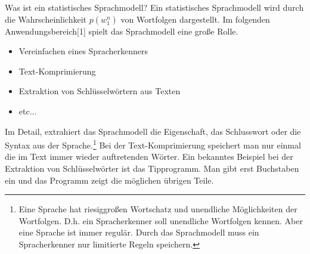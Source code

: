 
Was ist ein statistisches Sprachmodell? Ein statistisches Sprachmodell wird durch die Wahrscheinlichkeit $p(w_{1}^n)$ von Wortfolgen  dargestellt.
Im folgenden Anwendungsbereich[1] spielt das Sprachmodell eine gro\ss e Rolle.
\begin{itemize}
	\item Vereinfachen eines Spracherkenners
	\item Text-Komprimierung
	\item Extraktion von Schl\"usselw\"ortern aus Texten
	\item etc...
\end{itemize}
Im Detail, extrahiert das Sprachmodell die Eigenschaft, das Schlusswort oder die Syntax aus der Sprache.\footnote{Eine Sprache hat riesiggro\ss en Wortschatz und unendliche M\"oglichkeiten der Wortfolgen. D.h. ein Spracherkenner soll unendliche Wortfolgen kennen. Aber eine Sprache ist immer regul\"ar. Durch das Sprachmodell muss ein Spracherkenner  nur  limitierte Regeln speichern.}
Bei der Text-Komprimierung speichert man nur einmal die im Text immer wieder auftretenden W\"orter. Ein bekanntes Beispiel bei der Extraktion von Schl\"usselw\"orter ist das Tipprogramm. Man gibt erst Buchstaben ein und das Programm zeigt die m\"oglichen \"ubrigen Teile.